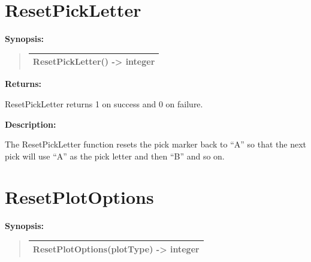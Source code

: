 \documentclass[letterpaper,10pt,english]{sphinxmanual}
\begin{document}
\section{ResetPickLetter}
\label{functions:resetpickletter}
\begin{DUlineblock}{0em}
\item[] \textbf{Synopsis:}
\end{DUlineblock}
\begin{quote}

\begin{tabulary}{\linewidth}{|L|}
\hline

ResetPickLetter() -\textgreater{} integer
\\
\hline\end{tabulary}

\end{quote}

\begin{DUlineblock}{0em}
\item[] 
\item[] \textbf{Returns:}
\item[] ResetPickLetter returns 1 on success and 0 on failure.
\item[] 
\item[] \textbf{Description:}
\item[] The ResetPickLetter function resets the pick marker back to ``A'' so that
the next pick will use ``A'' as the pick letter and then ``B'' and so on.
\end{DUlineblock}

\begin{DUlineblock}{0em}
\item[] 
\end{DUlineblock}


\section{ResetPlotOptions}
\label{functions:resetplotoptions}
\begin{DUlineblock}{0em}
\item[] \textbf{Synopsis:}
\end{DUlineblock}
\begin{quote}

\begin{tabulary}{\linewidth}{|L|}
\hline

ResetPlotOptions(plotType) -\textgreater{} integer
\\
\hline\end{tabulary}

\end{quote}
\end{document}
